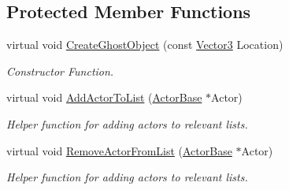 \subsection*{Protected Member Functions}
\begin{DoxyCompactItemize}
\item 
virtual void \hyperlink{classphys_1_1AreaEffect_afe30d4ffa4e16dfb151446960dad61ac}{CreateGhostObject} (const \hyperlink{classphys_1_1Vector3}{Vector3} Location)
\begin{DoxyCompactList}\small\item\em Constructor Function. \item\end{DoxyCompactList}\item 
\hypertarget{classphys_1_1AreaEffect_a7af039b84f8d55e2c1c2d5a1b57afd8a}{
virtual void \hyperlink{classphys_1_1AreaEffect_a7af039b84f8d55e2c1c2d5a1b57afd8a}{AddActorToList} (\hyperlink{classphys_1_1ActorBase}{ActorBase} $\ast$Actor)}
\label{d4/d55/classphys_1_1AreaEffect_a7af039b84f8d55e2c1c2d5a1b57afd8a}

\begin{DoxyCompactList}\small\item\em Helper function for adding actors to relevant lists. \item\end{DoxyCompactList}\item 
\hypertarget{classphys_1_1AreaEffect_a98bf156da3c7f8bb98d5ce9d37b6aa0f}{
virtual void \hyperlink{classphys_1_1AreaEffect_a98bf156da3c7f8bb98d5ce9d37b6aa0f}{RemoveActorFromList} (\hyperlink{classphys_1_1ActorBase}{ActorBase} $\ast$Actor)}
\label{d4/d55/classphys_1_1AreaEffect_a98bf156da3c7f8bb98d5ce9d37b6aa0f}

\begin{DoxyCompactList}\small\item\em Helper function for adding actors to relevant lists. \item\end{DoxyCompactList}\end{DoxyCompactItemize}
